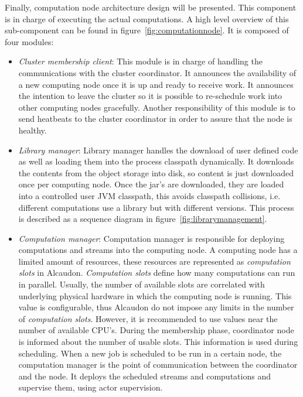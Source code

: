 Finally, computation node architecture design will be presented. This component
is in charge of executing the actual computations. A high level overview of this
sub-component can be found in figure~\ref{fig:computationnode}. It is composed
of four modules:
\begin{itemize}
\item \textit{Cluster membership client}: This module is in charge of handling
  the communications with the cluster coordinator. It announces the availability
  of a new computing node once it is up and ready to receive work. It announces
  the intention to leave the cluster so it is possible to re-schedule work into
  other computing nodes gracefully. Another responsibility of this module is to
  send heatbeats to the cluster coordinator in order to assure that the node is
  healthy.
\item \textit{Library manager}: Library manager handles the download of user
  defined code as well as loading them into the process classpath dynamically.
  It downloads the contents from the object storage into disk, so content is
  just downloaded once per computing node. Once the \acs{jar}'s are downloaded,
  they are loaded into a controlled user \acs{JVM} classpath, this avoids
  classpath collisions, i.e. different computations use a library but with
  different versions. This process is described as a sequence diagram in
  figure~\ref{fig:librarymanagement}.
\item \textit{Computation manager}: Computation manager is responsible for
  deploying computations and streams into the computing node. A computing node
  has a limited amount of resources, these resources are represented as
  \textit{computation slots} in Alcaudon. \textit{Computation slots}
  define how many computations can run in parallel. Usually, the number of
  available slots are correlated with underlying physical hardware in which the
  computing node is running. This value is configurable, thus Alcaudon do not
  impose any limits in the number of \textit{computation slots}. However, it
  is recommended to use values near the number of available CPU's. During
  the membership phase, coordinator node is informed about the number
  of usable slots. This information is used during scheduling. When a new
  job is scheduled to be run in a certain node, the computation manager
  is the point of communication between the coordinator and the node.
  It deploys the scheduled streams and computations and supervise them,
  using actor supervision.
\end{itemize}

